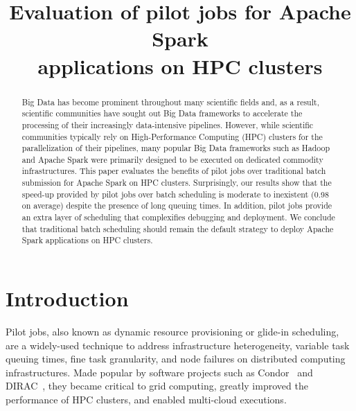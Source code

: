 \documentclass{IEEEtran}
\begin{document}
\title{Evaluation of pilot jobs for Apache Spark\\ applications on HPC clusters}
\author{
    \IEEEauthorblockA{}
}
\maketitle

\begin{abstract}
    Big Data has become prominent throughout many scientific fields and, as
    a result, scientific communities have sought out Big Data frameworks to
    accelerate the processing of their increasingly data-intensive
    pipelines. However, while scientific communities typically rely on
    High-Performance Computing (HPC) clusters for the parallelization of
    their pipelines, many popular Big Data frameworks such as Hadoop and
    Apache Spark were primarily designed to be executed on dedicated
    commodity infrastructures. This paper evaluates the benefits of pilot
    jobs over traditional batch submission for Apache Spark on HPC
    clusters. Surprisingly, our results show that the speed-up provided by
    pilot jobs over batch scheduling is moderate to inexistent (0.98 on
    average) despite the presence of long queuing times. In addition, pilot
    jobs provide an extra layer of scheduling that complexifies debugging
    and deployment. We conclude that traditional batch scheduling should
    remain the default strategy to deploy Apache Spark applications on
    HPC clusters.

\end{abstract}

\section{Introduction}

Pilot jobs, also known as dynamic resource provisioning or glide-in
scheduling, are a widely-used technique to address infrastructure
heterogeneity, variable task queuing times, fine task granularity, and node
failures on distributed computing infrastructures. Made popular by software
projects such as Condor~\cite{thain2005distributed} and DIRAC~\cite{casajus2010dirac}, they
became critical to grid computing, greatly improved the performance of HPC
clusters, and enabled multi-cloud executions. 
\end{document}

